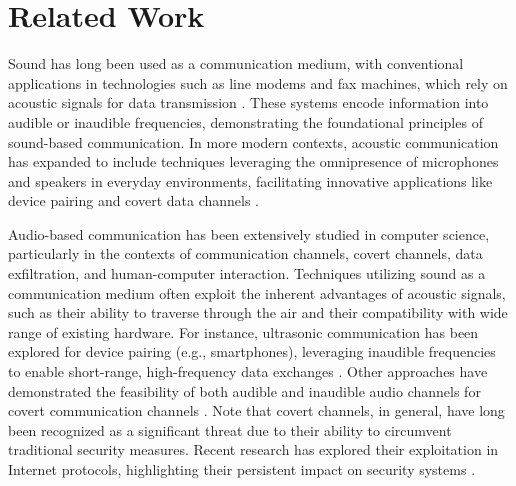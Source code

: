 \section{Related Work}
Sound has long been used as a communication medium, with conventional applications in technologies such as line modems and fax machines, which rely on acoustic signals for data transmission \cite{hanes2008fax}. These systems encode information into audible or inaudible frequencies, demonstrating the foundational principles of sound-based communication. In more modern contexts, acoustic communication has expanded to include techniques leveraging the omnipresence of microphones and speakers in everyday environments, facilitating innovative applications like device pairing and covert data channels \cite{hanspach2014recent}. 

Audio-based communication has been extensively studied in computer science, particularly in the contexts of communication channels, covert channels, data exfiltration, and human-computer interaction. Techniques utilizing sound as a communication medium often exploit the inherent advantages of acoustic signals, such as their ability to traverse through the air and their compatibility with wide range of existing hardware. For instance, ultrasonic communication has been explored for device pairing (e.g., smartphones), leveraging inaudible frequencies to enable short-range, high-frequency data exchanges \cite{getreuer2017ultrasonic}. Other approaches have demonstrated the feasibility of both audible and inaudible audio channels for covert communication channels \cite{wong2018crossing}. Note that covert channels, in general, have long been recognized as a significant threat due to their ability to circumvent traditional security measures. Recent research has explored their exploitation in Internet protocols, highlighting their persistent impact on security systems \cite{Caviglione2024, Zorawski2023}.


